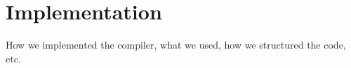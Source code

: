 \section{Implementation}

How we implemented the compiler, what we used, how we structured the code, etc.

